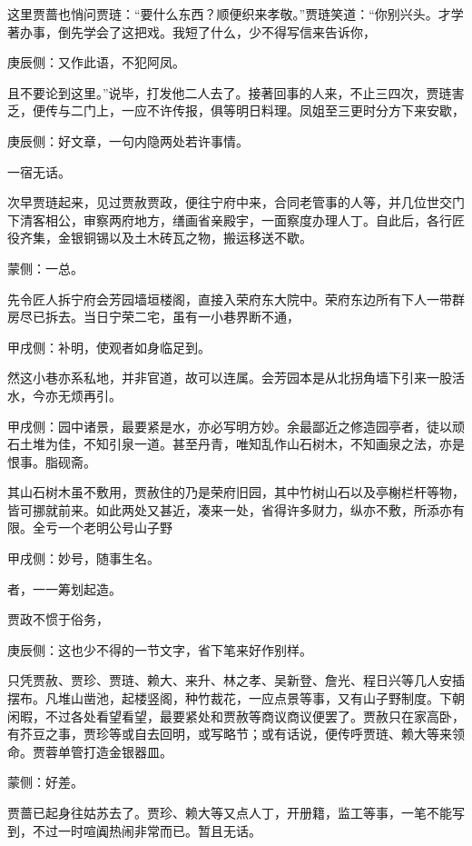 \begin{parag}
    这里贾蔷也悄问贾琏：“要什么东西？顺便织来孝敬。”贾琏笑道：“你别兴头。才学著办事，倒先学会了这把戏。我短了什么，少不得写信来告诉你，\begin{note}庚辰侧：又作此语，不犯阿凤。\end{note}且不要论到这里。”说毕，打发他二人去了。接著回事的人来，不止三四次，贾琏害乏，便传与二门上，一应不许传报，俱等明日料理。凤姐至三更时分方下来安歇，\begin{note}庚辰侧：好文章，一句内隐两处若许事情。\end{note}一宿无话。
\end{parag}


\begin{parag}
    次早贾琏起来，见过贾赦贾政，便往宁府中来，合同老管事的人等，并几位世交门下清客相公，审察两府地方，缮画省亲殿宇，一面察度办理人丁。自此后，各行匠役齐集，金银铜锡以及土木砖瓦之物，搬运移送不歇。\begin{note}蒙侧：一总。\end{note}先令匠人拆宁府会芳园墙垣楼阁，直接入荣府东大院中。荣府东边所有下人一带群房尽已拆去。当日宁荣二宅，虽有一小巷界断不通，\begin{note}甲戌侧：补明，使观者如身临足到。\end{note}然这小巷亦系私地，并非官道，故可以连属。会芳园本是从北拐角墙下引来一股活水，今亦无烦再引。\begin{note}甲戌侧：园中诸景，最要紧是水，亦必写明方妙。余最鄙近之修造园亭者，徒以顽石土堆为佳，不知引泉一道。甚至丹青，唯知乱作山石树木，不知画泉之法，亦是恨事。脂砚斋。\end{note}其山石树木虽不敷用，贾赦住的乃是荣府旧园，其中竹树山石以及亭榭栏杆等物，皆可挪就前来。如此两处又甚近，凑来一处，省得许多财力，纵亦不敷，所添亦有限。全亏一个老明公号山子野\begin{note}甲戌侧：妙号，随事生名。\end{note}者，一一筹划起造。
\end{parag}


\begin{parag}
    贾政不惯于俗务，\begin{note}庚辰侧：这也少不得的一节文字，省下笔来好作别样。\end{note}只凭贾赦、贾珍、贾琏、赖大、来升、林之孝、吴新登、詹光、程日兴等几人安插摆布。凡堆山凿池，起楼竖阁，种竹裁花，一应点景等事，又有山子野制度。下朝闲暇，不过各处看望看望，最要紧处和贾赦等商议商议便罢了。贾赦只在家高卧，有芥豆之事，贾珍等或自去回明，或写略节；或有话说，便传呼贾琏、赖大等来领命。贾蓉单管打造金银器皿。\begin{note}蒙侧：好差。\end{note}贾蔷已起身往姑苏去了。贾珍、赖大等又点人丁，开册籍，监工等事，一笔不能写到，不过一时喧阗热闹非常而已。暂且无话。
\end{parag}


